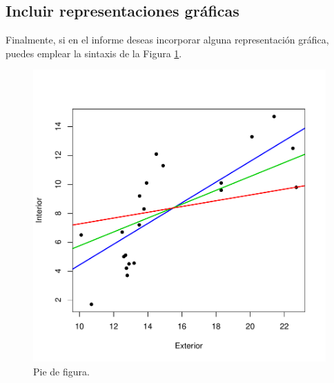 \documentclass[11pt]{article}
\begin{document}
\subsection{Incluir representaciones gráficas}
Finalmente, si en el informe deseas incorporar alguna representación gráfica, puedes emplear la sintaxis de la Figura \ref{etiqueta}.
\begin{figure}
\begin{center} 
\includegraphics[scale=0.5]{exemplo-figura.pdf} 
\end{center} 
\caption{Pie de figura.}
\label{etiqueta}
\end{figure}
\end{document}
